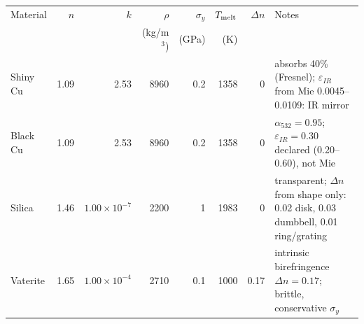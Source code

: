 \begin{tabular}{@{}lrrrrrrp{4.2cm}@{}}
\hline
Material & $n$ & $k$ & $\rho$ & $\sigma_y$ & $T_{\rm melt}$ & $\Delta n$ & Notes \\
 & & & (kg/m$^3$) & (GPa) & (K) & & \\
\hline
Shiny Cu & 1.09 & 2.53 & 8960 & 0.2 & 1358 & 0 & absorbs 40\% (Fresnel); $\varepsilon_{IR}$ from Mie 0.0045--0.0109: IR mirror \\
Black Cu & 1.09 & 2.53 & 8960 & 0.2 & 1358 & 0 & $\alpha_{532}=0.95$; $\varepsilon_{IR}=0.30$ declared (0.20--0.60), not Mie \\
Silica & 1.46 & $1.00\times10^{-7}$ & 2200 & 1 & 1983 & 0 & transparent; $\Delta n$ from shape only: 0.02 disk, 0.03 dumbbell, 0.01 ring/grating \\
Vaterite & 1.65 & $1.00\times10^{-4}$ & 2710 & 0.1 & 1000 & 0.17 & intrinsic birefringence $\Delta n=0.17$; brittle, conservative $\sigma_y$ \\
\hline
\end{tabular}
